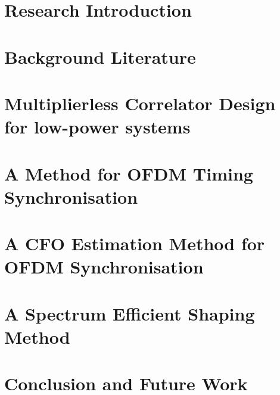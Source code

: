 \chapter{Research Introduction}
\label{chap:introduction}
%
\chapter{Background Literature}
\label{chap:BackgroundLiterature}
%
\chapter{Multiplierless Correlator Design for low-power systems}
\label{chap:multiplierlesscorrelator}
%
\chapter{A Method for OFDM Timing Synchronisation}
\label{chap:Synchronisation}
%
\chapter{A CFO Estimation Method for OFDM Synchronisation}
\label{chap:CFO}
%
\chapter{A Spectrum Efficient Shaping Method}
\label{chap:SpectralLeakage}



%
\chapter{Conclusion and Future Work}
\label{chap:conclusion}





\appendix
%

\newpage
{}








